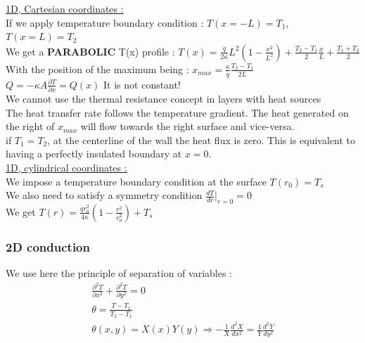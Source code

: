 \documentclass[../main.tex]{subfiles}
\begin{document}
\quad \underline{1D, Cartesian coordinates :}\\

If we apply temperature boundary condition : $T(x=-L) = T_1$, $T(x=L)=T_2$\\
We get a \textbf{PARABOLIC} T(x) profile : $T(x) = \frac{\dot{q}}{2\kappa}L^2(1-\frac{x^2}{L^2})+\frac{T_2-T_1}{2} \frac{x}{L} + \frac{T_1+T_2}{2}$\\

With the position of the maximum being : $x_{max} = \frac{\kappa}{\dot{q}} \frac{T_2-T_1}{2L}$\\

$Q = -\kappa A \frac{\partial T}{\partial x} = Q(x)$ \warning It is not constant!\\

\warning We cannot use the thermal resistance concept in layers with heat sources\\

The heat transfer rate follows the temperature gradient. The heat generated on the right of $x_{max}$ will flow towards the right surface and vice-versa.\\

if $T_1 = T_2$, at the centerline of the wall the heat flux is zero. This is equivalent to having a perfectly insulated boundary at $x=0$.\\

\quad \underline{1D, cylindrical coordinates :}\\

We impose a temperature boundary condition at the surface $T(r_0)= T_s$\\
We also need to satisfy a symmetry condition $\frac{dT}{dr}\lvert_{r=0}=0$\\

We get $T(r)= \frac{\dot{q}r_0^2}{4\kappa}(1-\frac{r^2}{r_0^2})+T_s$\\

\subsubsection{2D conduction}

We use here the principle of separation of variables : 
\begin{equation}
    \begin{gathered}
        \frac{\partial^2 T}{\partial x^2} + \frac{\partial^2 T}{\partial y^2} = 0\\
        \theta = \frac{T-T_1}{T_2-T_1}\\
        \theta(x,y) = X(x)Y(y) \Rightarrow -\frac{1}{X} \frac{d^2X}{dx^2} = \frac{1}{Y} \frac{d^2Y}{dy^2}\\
    \end{gathered}
\end{equation}
\end{document}
